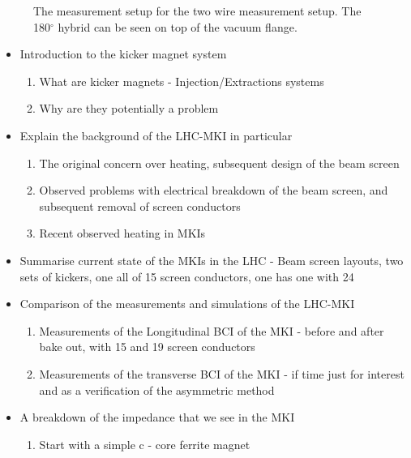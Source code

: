 \begin{figure}
\label{fig:mki-meas-two-wire}
\caption{The measurement setup for the two wire measurement setup. The 180$^{\circ}$ hybrid can be seen on top of the vacuum flange.}
\end{figure}

\begin{itemize}
\item{Introduction to the kicker magnet system}                                                                                                                                                                                                                                                                                                             
\begin{enumerate}
\item{What are kicker magnets - Injection/Extractions systems}
\item{Why are they potentially a problem}
\end{enumerate}
\item{Explain the background of the LHC-MKI in particular}
\begin{enumerate}
\item{The original concern over heating, subsequent design of the beam screen}
\item{Observed problems with electrical breakdown of the beam screen, and subsequent removal of screen conductors}
\item{Recent observed heating in MKIs}
\end{enumerate}
\item{Summarise current state of the MKIs in the LHC - Beam screen layouts, two sets of kickers, one all of 15 screen conductors, one has one with 24}
\item{Comparison of the measurements and simulations of the LHC-MKI}
\begin{enumerate}
\item{Measurements of the Longitudinal BCI of the MKI - before and after bake out, with 15 and 19 screen conductors}
\item{Measurements of the transverse BCI of the MKI - if time just for interest and as a verification of the asymmetric method}
\end{enumerate}
\item{A breakdown of the impedance that we see in the MKI}
\begin{enumerate}
\item{Start with a simple c - core ferrite magnet}

\end{enumerate}
\end{itemize}
